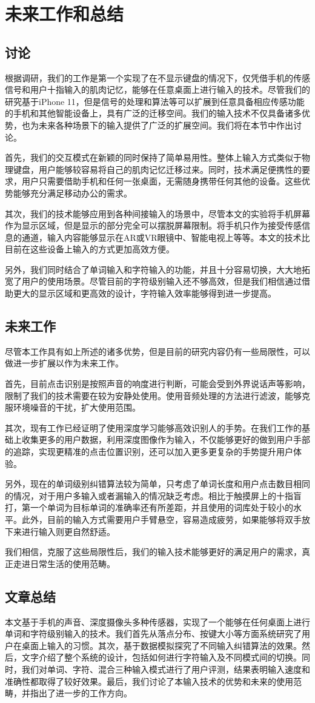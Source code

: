 \chapter{未来工作和总结}
\label{cha:conclusion}
\section{讨论}
根据调研，我们的工作是第一个实现了在不显示键盘的情况下，仅凭借手机的传感信号和用户十指输入的肌肉记忆，能够在任意桌面上进行输入的技术。尽管我们的研究基于iPhone 11，但是信号的处理和算法等可以扩展到任意具备相应传感功能的手机和其他智能设备上，具有广泛的迁移空间。我们的输入技术不仅具备诸多优势，也为未来各种场景下的输入提供了广泛的扩展空间。我们将在本节中作出讨论。

首先，我们的交互模式在新颖的同时保持了简单易用性。整体上输入方式类似于物理键盘，用户能够较容易将自己的肌肉记忆迁移过来。同时，技术满足便携性的要求，用户只需要借助手机和任何一张桌面，无需随身携带任何其他的设备。这些优势能够充分满足移动办公的需求。

其次，我们的技术能够应用到各种间接输入的场景中，尽管本文的实验将手机屏幕作为显示区域，但是显示的部分完全可以摆脱屏幕限制。将手机只作为接受传感信息的通道，输入内容能够显示在AR或VR眼镜中、智能电视上等等。本文的技术比目前在这些设备上输入的方式更加高效方便。

另外，我们同时结合了单词输入和字符输入的功能，并且十分容易切换，大大地拓宽了用户的使用场景。尽管目前的字符级别输入还不够高效，但是我们相信通过借助更大的显示区域和更高效的设计，字符输入效率能够得到进一步提高。

\section{未来工作}
尽管本工作具有如上所述的诸多优势，但是目前的研究内容仍有一些局限性，可以做进一步扩展以作为未来工作。

首先，目前点击识别是按照声音的响度进行判断，可能会受到外界说话声等影响，限制了我们的技术需要在较为安静处使用。使用音频处理的方法进行滤波，能够克服环境噪音的干扰，扩大使用范围。

其次，现有工作已经证明了使用深度学习能够高效识别人的手势\cite{MolchanovGKK15}。在我们工作的基础上收集更多的用户数据，利用深度图像作为输入，不仅能够更好的做到用户手部的追踪，实现更精准的点击位置识别，还可以加入更多更复杂的手势提升用户体验。

另外，现在的单词级别纠错算法较为简单，只考虑了单词长度和用户点击数目相同的情况，对于用户多输入或者漏输入的情况缺乏考虑。相比于触摸屏上的十指盲打，第一个单词为目标单词的准确率还有所差距，并且使用的词库处于较小的水平。此外，目前的输入方式需要用户手臂悬空，容易造成疲劳，如果能够将双手放下来进行输入则更自然舒适。

我们相信，克服了这些局限性后，我们的输入技术能够更好的满足用户的需求，真正走进日常生活的使用范畴。

\section{文章总结}
本文基于手机的声音、深度摄像头多种传感器，实现了一个能够在任何桌面上进行单词和字符级别输入的技术。我们首先从落点分布、按键大小等方面系统研究了用户在桌面上输入的习惯。其次，基于数据模拟探究了不同输入纠错算法的效果。然后，文字介绍了整个系统的设计，包括如何进行字符输入及不同模式间的切换。同时，我们对单词、字符、混合三种输入模式进行了用户评测，结果表明输入速度和准确性都取得了较好效果。最后，我们讨论了本输入技术的优势和未来的使用范畴，并指出了进一步的工作方向。